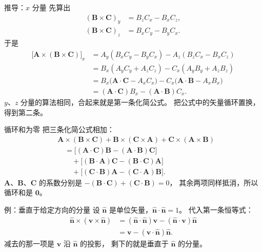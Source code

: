 \documentclass[fontset=windows, chinese, 10pt, xcolor=dvipsnames]{beamer}
\begin{document}
\begin{frame}{推导：$x$ 分量}
  先算出
  \begin{align*}
    (\mathbf{B}\times\mathbf{C})_y
    &= B_z C_x-B_x C_z,\\
    (\mathbf{B}\times\mathbf{C})_z
    &= B_x C_y-B_y C_x.
  \end{align*}
  于是
  \begin{align*}
    \bigl[\mathbf{A}\times(\mathbf{B}\times\mathbf{C})\bigr]_x
    &= A_y(B_x C_y-B_y C_x)
     - A_z(B_z C_x-B_x C_z) \\
    &= B_x(A_y C_y+A_z C_z)
     - C_x(A_y B_y+A_z B_z) \\
    &= B_x\bigl(\mathbf{A}\cdot\mathbf{C}-A_x C_x\bigr)
     - C_x\bigl(\mathbf{A}\cdot\mathbf{B}-A_x B_x\bigr) \\
    &= (\mathbf{A}\cdot\mathbf{C})B_x
     - (\mathbf{A}\cdot\mathbf{B})C_x.
  \end{align*}
  $y$、$z$ 分量的算法相同，合起来就是第一条化简公式。
  把公式中的矢量循环置换，得到第二条。
\end{frame}

\begin{frame}{循环和为零}
  把三条化简公式相加：
  \begin{align*}
    &\mathbf{A}\times(\mathbf{B}\times\mathbf{C})
     + \mathbf{B}\times(\mathbf{C}\times\mathbf{A})
     + \mathbf{C}\times(\mathbf{A}\times\mathbf{B}) \\
    &\quad =
      \bigl[(\mathbf{A}\cdot\mathbf{C})\mathbf{B}-(\mathbf{A}\cdot\mathbf{B})\mathbf{C}\bigr] \\
    &\qquad +
      \bigl[(\mathbf{B}\cdot\mathbf{A})\mathbf{C}-(\mathbf{B}\cdot\mathbf{C})\mathbf{A}\bigr] \\
    &\qquad +
      \bigl[(\mathbf{C}\cdot\mathbf{B})\mathbf{A}-(\mathbf{C}\cdot\mathbf{A})\mathbf{B}\bigr].
  \end{align*}
  $\mathbf{A}$、$\mathbf{B}$、$\mathbf{C}$ 的系数分别是
  $-(\mathbf{B}\cdot\mathbf{C})+(\mathbf{C}\cdot\mathbf{B})=0$，
  其余两项同样抵消，所以循环和是 $\mathbf{0}$。
\end{frame}

\begin{frame}{例：垂直于给定方向的分量}
  设 $\hat{\mathbf{n}}$ 是单位矢量，$\hat{\mathbf{n}}\cdot\hat{\mathbf{n}}=1$。
  代入第一条恒等式：
  \begin{align*}
    \hat{\mathbf{n}}\times(\mathbf{v}\times\hat{\mathbf{n}})
    &= (\hat{\mathbf{n}}\cdot\hat{\mathbf{n}})\mathbf{v}
     - (\hat{\mathbf{n}}\cdot\mathbf{v})\hat{\mathbf{n}} \\
    &= \mathbf{v}-(\mathbf{v}\cdot\hat{\mathbf{n}})\hat{\mathbf{n}}.
  \end{align*}
  减去的那一项是 $\mathbf{v}$ 沿 $\hat{\mathbf{n}}$ 的投影，
  剩下的就是垂直于 $\hat{\mathbf{n}}$ 的分量。
\end{frame}
\end{document}
